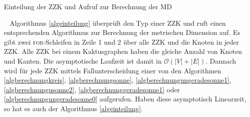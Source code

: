 \begin{algorithm}
\caption{Einteilung der ZZK und Aufruf zur Berechnung der MD}
\begin{algorithmic}[1]
\vspace{2mm}
\FORALL{($x \in ZZK$%
)}{
\FORALL{($v \in x$)}{ 
\STATE Erhöhe $K[x]$ um eins für jeden Knoten $v$ mit $Klasse[v]=0$ oder $Klasse[v]=A$;
\STATE Erhöhe $S[x]$ um eins für jeden Knoten $v$ mit $Klasse[v]\neq 0$;
\STATE Erhöhe $Anker[x]$ um eins für jeden Knoten $v$ mit $Klasse[v]=A$;
}\ENDFOR
\IF{($x.Knoten==S[x]$)}{\STATE $S(x)$;}\ELSIF{($x.Knoten==K[x]$)}{\STATE $K(x)$;}\ELSE{\IF{($Anker[x] \leq 2$ oder $Anker[x] \geq \frac{n}{2}$)}{
		\IF{($(n\; \textbf{mod} \; 2)==1$ oder $n==4$)}
		{		 \STATE $USU(x)$;
			}
		\ELSIF{($(n\; \textbf{mod} \; 2)==0$)}{
		\IF{($Anker[x]==0$)}{\STATE $USG0(x)$;}
			\ELSE{\STATE $USG1(x)$;}
			\ENDIF
		}\ENDIF}
	\ELSE{\STATE $US(x)$;
	}\ENDIF}\ENDIF
}\ENDFOR
\vspace{2mm}
\end{algorithmic}
\label{algeinteilung}
\end{algorithm}
\vspace{-2mm}
~\linebreak
Algorithmus \ref{algeinteilung} überprüft den Typ einer ZZK und ruft einen entsprechenden Algorithmus zur Berechnung der metrischen Dimension auf. Es gibt zwei \textsc{for}-Schleifen in Zeile 1 und 2 über alle ZZK und die Knoten in jeder ZZK. Alle ZZK bei einem Kaktusgraphen haben die gleiche Anzahl von Knoten und Kanten. Die asymptotische Laufzeit ist damit in $\mathcal{O}(|V|+|E|)$. Dannach wird für jede ZZK mittels Fallunterscheidung einer von den Algorithmen \ref{algberechnungkreis}, \ref{algberechnungsonne}, \ref{algberechnungungeradesonne1}, \ref{algberechnungusonne2}, \ref{algberechnunggeradesonne1} oder \ref{algberechnungungeradesonne0} aufgerufen. Haben diese asymptotisch Linearzeit, so hat es auch der Algorithmus \ref{algeinteilung}.
\newpage


